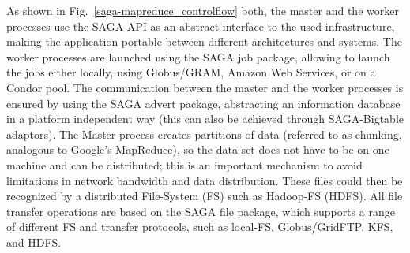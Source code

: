 \documentclass[conference,final]{IEEEtran}
\begin{document}





As shown in Fig.~\ref{saga-mapreduce_controlflow} both, the master and
the worker processes use the SAGA-API as an abstract interface to the
used infrastructure, making the application portable between different
architectures and systems. The worker processes are launched using the
SAGA job package, allowing to launch the jobs either locally, using
Globus/GRAM, Amazon Web Services, or on a Condor pool. The
communication between the master and the worker processes is ensured
by using the SAGA advert package, abstracting an information database
in a platform independent way (this can also be achieved through
SAGA-Bigtable adaptors).  The Master process creates partitions of
data (referred to as chunking, analogous to Google's MapReduce), so
the data-set does not have to be on one machine and can be
distributed; this is an important mechanism to avoid limitations in
network bandwidth and data distribution.  These files could then be
recognized by a distributed File-System (FS) such as Hadoop-FS
(HDFS). All file transfer operations are based on the SAGA file
package, which supports a range of different FS and transfer
protocols, such as local-FS, Globus/GridFTP, KFS, and HDFS.
\end{document}
